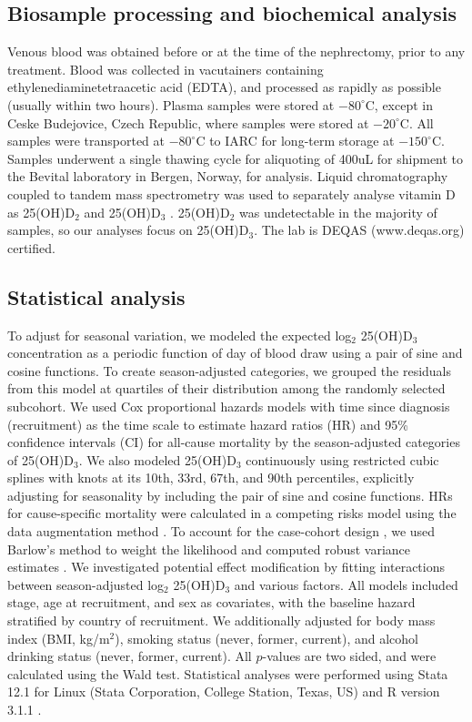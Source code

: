 \documentclass[a4paper,11pt]{article}
\renewcommand{\cite}{\citep}
\begin{document}
\subsection*{Biosample processing and biochemical analysis}
Venous blood was obtained before or at the time of the nephrectomy, prior to 
any treatment. Blood was collected in vacutainers containing 
ethylenediaminetetraacetic acid (EDTA), and processed as rapidly as possible 
(usually within two hours). Plasma samples were stored at $-80^{\circ}$C, 
except in Ceske Budejovice, Czech Republic, where samples were stored at 
$-20^{\circ}$C. All samples were transported at $-80^{\circ}$C to IARC for 
long-term storage at $-150^{\circ}$C. Samples underwent a single thawing cycle 
for aliquoting of 400uL for shipment to the Bevital laboratory in Bergen, 
Norway, for analysis. Liquid chromatography coupled to tandem 
mass spectrometry was used to separately analyse vitamin D as 25(OH)D$_2$ and 
25(OH)D$_3$ \cite{midttun_determination_2011}. 25(OH)D$_2$ was undetectable in 
the majority of samples, so our analyses focus on 25(OH)D$_3$. The lab is DEQAS 
(www.deqas.org) certified.

\subsection*{Statistical analysis}
To adjust for seasonal variation, we modeled the expected log$_2$ 25(OH)D$_3$ 
concentration as a periodic function of day of blood draw using a pair of sine 
and cosine functions. To create season-adjusted categories, we grouped the 
residuals from this model at quartiles of their distribution among the randomly 
selected subcohort. We used Cox proportional hazards models with time since 
diagnosis (recruitment) as the time scale to estimate hazard ratios (HR) and 
95\% confidence intervals (CI) for all-cause mortality by the season-adjusted 
categories of 25(OH)D$_3$. We also modeled 25(OH)D$_3$ continuously using 
restricted cubic splines with knots at its 10th, 33rd, 67th, and 90th 
percentiles, explicitly adjusting for seasonality by including the pair of sine 
and cosine functions. HRs for cause-specific mortality were calculated in a 
competing risks model using the data augmentation method 
\cite{lunn_applying_1995}. To account for the case-cohort design 
\cite{prentice_case-cohort_1986}, we used Barlow's method to weight the 
likelihood and computed robust variance estimates \cite{barlow_robust_1994, 
barlow_analysis_1999}. We investigated potential effect modification by fitting 
interactions between season-adjusted log$_2$ 25(OH)D$_3$ and various factors. 
All models included stage, age at recruitment, and sex as covariates, with the 
baseline hazard stratified by country of recruitment. We additionally adjusted 
for body mass index (BMI, kg/m$^2$), smoking status (never, former, current), 
and alcohol drinking status (never, former, current).
All $p$-values are two sided, and were calculated using the Wald test. 
Statistical analyses were performed using Stata 12.1 for Linux (Stata 
Corporation, College Station, Texas, US) and R version 3.1.1 \cite{r_2014}.
\end{document}
